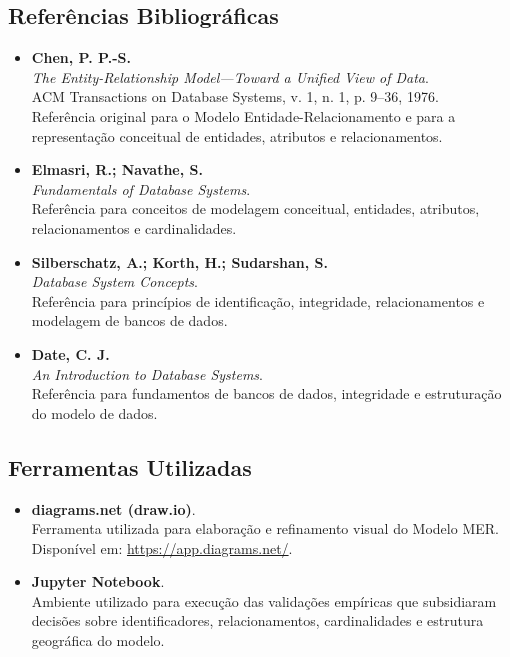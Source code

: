 \documentclass[12pt,a4paper]{article}
\begin{document}
	\subsection{Referências Bibliográficas}
	
	\begin{itemize}[leftmargin=1.2cm]
		
		\item \textbf{Chen, P. P.-S.} \\
		\textit{The Entity-Relationship Model---Toward a Unified View of Data}. \\
		ACM Transactions on Database Systems, v. 1, n. 1, p. 9--36, 1976. \\
		Referência original para o Modelo Entidade-Relacionamento e para a
		representação conceitual de entidades, atributos e relacionamentos.
		
		\item \textbf{Elmasri, R.; Navathe, S.} \\
		\textit{Fundamentals of Database Systems}. \\
		Referência para conceitos de modelagem conceitual, entidades,
		atributos, relacionamentos e cardinalidades.
		
		\item \textbf{Silberschatz, A.; Korth, H.; Sudarshan, S.} \\
		\textit{Database System Concepts}. \\
		Referência para princípios de identificação, integridade,
		relacionamentos e modelagem de bancos de dados.
		
		\item \textbf{Date, C. J.} \\
		\textit{An Introduction to Database Systems}. \\
		Referência para fundamentos de bancos de dados, integridade e
		estruturação do modelo de dados.
		
	\end{itemize}
	
	\enlargethispage{2\baselineskip}
	\subsection{Ferramentas Utilizadas}
	
	\begin{itemize}[leftmargin=1.2cm]
		
		\item \textbf{diagrams.net (draw.io)}. \\
		Ferramenta utilizada para elaboração e refinamento visual do
		Modelo MER. \\
		Disponível em:
		\url{https://app.diagrams.net/}.
		
		\item \textbf{Jupyter Notebook}. \\
		Ambiente utilizado para execução das validações empíricas que
		subsidiaram decisões sobre identificadores, relacionamentos,
		cardinalidades e estrutura geográfica do modelo.
		
	\end{itemize}
	
\end{document}
